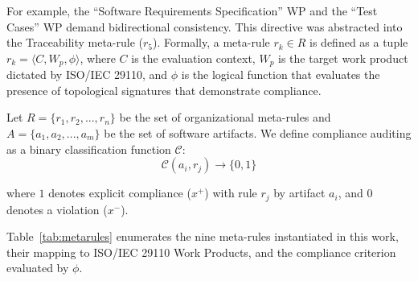 \documentclass{ieeeaccess}
\begin{document}
For example, the ``Software Requirements Specification'' WP and the ``Test Cases'' WP demand bidirectional consistency. This directive was abstracted into the Traceability meta-rule ($r_5$). Formally, a meta-rule $r_k \in R$ is defined as a tuple $r_k = \langle C, W_p, \phi \rangle$, where $C$ is the evaluation context, $W_p$ is the target work product dictated by ISO/IEC 29110, and $\phi$ is the logical function that evaluates the presence of topological signatures that demonstrate compliance.

Let $R = \{r_1, r_2, ..., r_n\}$ be the set of organizational meta-rules and $A = \{a_1, a_2, ..., a_m\}$ be the set of software artifacts. We define compliance auditing as a binary classification function $\mathcal{C}$:
\begin{equation}
\mathcal{C}(a_i, r_j) \rightarrow \{0, 1\}
\label{eq:classification}
\end{equation}

where $1$ denotes explicit compliance ($x^+$) with rule $r_j$ by artifact $a_i$, and $0$ denotes a violation ($x^-$).

Table~\ref{tab:metarules} enumerates the nine meta-rules instantiated in this work, their mapping to ISO/IEC 29110 Work Products, and the compliance criterion evaluated by $\phi$.
\end{document}

